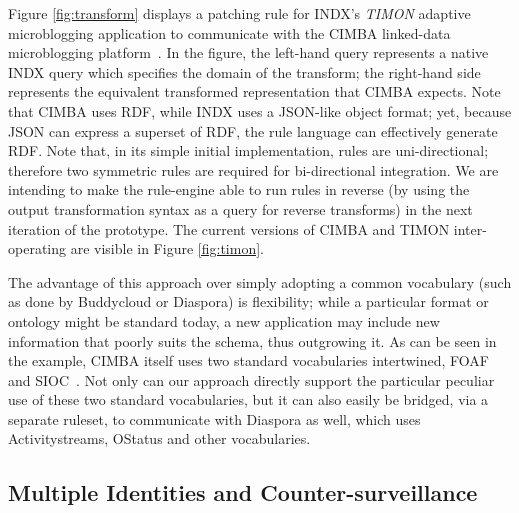 \documentclass{sig-alternate}
\begin{document}
Figure \ref{fig:transform} displays a patching rule for INDX's \emph{TIMON} adaptive microblogging application to communicate with the CIMBA linked-data microblogging platform~\cite{sambracimba, presbrey2014linked}. In the figure, the left-hand query represents a native INDX query which specifies the domain of the transform; the right-hand side represents the equivalent transformed representation that CIMBA expects. Note that CIMBA uses RDF, while INDX uses a JSON-like object format; yet, because JSON can express a superset of RDF, the rule language can effectively generate RDF. Note that, in its simple initial implementation, rules are uni-directional; therefore two symmetric rules are required for bi-directional integration. We are intending to make the rule-engine able to run rules in reverse (by using the output transformation syntax as a query for reverse transforms) in the next iteration of the prototype.  The current versions of CIMBA and TIMON inter-operating are visible in Figure \ref{fig:timon}.

The advantage of this approach over simply adopting a common vocabulary (such as done by Buddycloud or Diaspora) is flexibility; while a particular format or ontology might be standard today, a new application may include new information that poorly suits the schema, thus outgrowing it.  As can be seen in the example, CIMBA itself uses two standard vocabularies intertwined, FOAF~\cite{brickley2012foaf} and SIOC~\cite{champin2010sioc}.  Not only can our approach directly support the particular peculiar use of these two standard vocabularies, but it can also easily be bridged, via a separate ruleset, to communicate with Diaspora as well, which uses Activitystreams, OStatus and other vocabularies.  

\subsection{Multiple Identities and Counter-surveillance}

\end{document}
